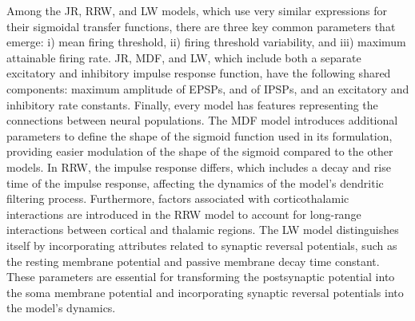 \documentclass[12pt,twoside]{article}
\begin{document}
Among the JR, RRW, and LW models, which use very similar expressions for their sigmoidal transfer functions, there are three key common parameters that emerge: i) mean firing threshold, ii) firing threshold variability, and iii) maximum attainable firing rate. JR, MDF, and LW, which include both a separate excitatory and inhibitory impulse response function, have the following shared components: maximum amplitude of EPSPs, and of IPSPs, and an excitatory and inhibitory rate constants. Finally, every model has features representing the connections between neural populations. The MDF model introduces additional parameters to define the shape of the sigmoid function used in its formulation, providing easier modulation of the shape of the sigmoid compared to the other models. In RRW, the impulse response differs, which includes a decay and rise time of the impulse response, affecting the dynamics of the model's dendritic filtering process. Furthermore, factors associated with corticothalamic interactions are introduced in the RRW model to account for long-range interactions between cortical and thalamic regions. The LW model distinguishes itself by incorporating attributes related to synaptic reversal potentials, such as the resting membrane potential and passive membrane decay time constant. These parameters are essential for transforming the postsynaptic potential into the soma membrane potential and incorporating synaptic reversal potentials into the model's dynamics. 

\end{document}
